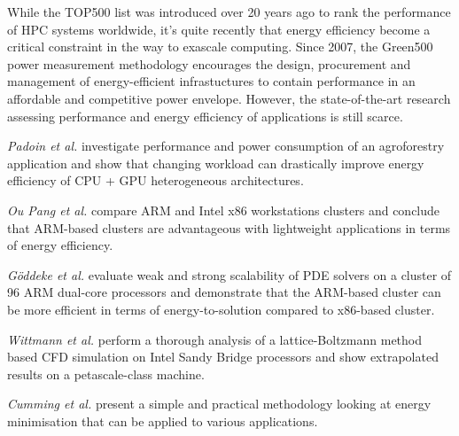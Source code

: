 While the  TOP500 list was  introduced over 20  years ago to  rank the
performance of HPC systems  worldwide, it's quite recently that energy
efficiency  become  a  critical  constraint  in the  way  to  exascale
computing.   Since 2007,  the Green500  power  measurement methodology
encourages the design,  procurement and management of energy-efficient
infrastuctures to contain performance in an affordable and competitive
power  envelope.   However,  the state-of-the-art  research  assessing
performance  and energy  efficiency  of applications  is still scarce.

\emph{Padoin et al.}   \citep{Padoin-2013} investigate performance and
power  consumption  of  an  agroforestry  application  and  show  that
changing workload  can drastically improve energy efficiency  of CPU +
GPU heterogeneous architectures.

\emph{Ou  Pang et  al.}   \citep{Ou-2012} compare  ARM  and Intel  x86
workstations  clusters  and   conclude  that  ARM-based  clusters  are
advantageous  with   lightweight  applications  in   terms  of  energy
efficiency.

\emph{G\"oddeke et al.}  \citep{Goddeke-2013} evaluate weak and strong
scalability of PDE solvers on a cluster of 96 ARM dual-core processors
and demonstrate  that the ARM-based  cluster can be more  efficient in
terms of energy-to-solution compared to x86-based cluster.

\emph{Wittmann  et  al.}   \citep{Wittmann-2013}  perform  a  thorough
analysis of  a lattice-Boltzmann method based CFD  simulation on Intel
Sandy   Bridge  processors   and  show   extrapolated  results   on  a
petascale-class machine.

\emph{Cumming  et  al.}   \citep{Cumming-2014}  present a  simple  and
practical  methodology  looking at  energy  minimisation  that can  be
applied to various applications.
